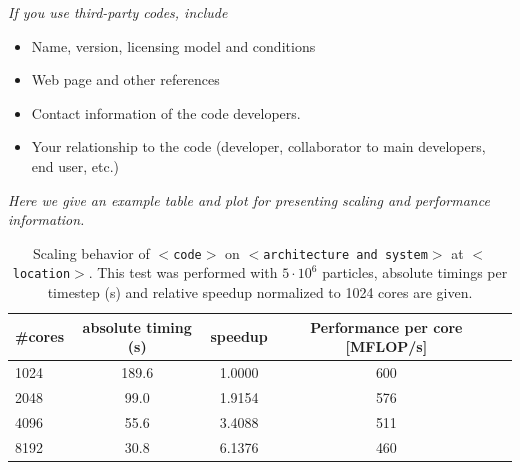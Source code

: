 \documentclass [a4paper, 12pt]{article}
\begin{document}
\textit{If you use third-party codes, include}
\begin{itshape}
\begin{itemize}\setlength{\itemsep}{-2pt}
  \item Name, version, licensing model and conditions
  \item Web page and other references
  \item Contact information of the code developers.
  \item Your relationship to the code (developer, collaborator to main developers, end user, etc.)
\end{itemize}
\end{itshape}
\textit{Here we give an example table and plot for presenting scaling and performance information.}

\begin{table}[H]
\caption{\label{tab_scaling} Scaling behavior of {\tt $<$code$>$} on {\tt $<$architecture and system$>$} at {\tt $<$location$>$}. This test was performed with $5\cdot 10^6$ particles, absolute timings per timestep (s) and relative speedup normalized to 1024 cores are given.}
\begin{center} 
\setlength{\tabcolsep}{10pt}
\renewcommand{\arraystretch}{1.2}
 \begin{tabular}{lcccc}
 \#cores  & absolute timing (s) & speedup  & Performance per core [MFLOP/s]\\
\hline
1024     & 189.6                        & 1.0000   & 600 \\
2048     & \phantom{1}99.0      & 1.9154   & 576 \\
4096     & \phantom{1}55.6      & 3.4088   & 511 \\
8192     & \phantom{1}30.8      & 6.1376   & 460 \\

\end{tabular}
\end{center}
\end{table}
\end{document}
